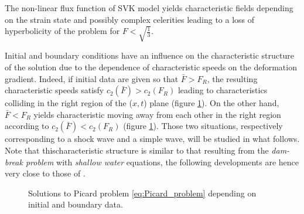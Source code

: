 \begin{remark}
  \label{rq:hyperbolicity_limit_SVK}
  The non-linear flux function of SVK model yields characteristic fields depending on the strain state and possibly complex celerities leading to a loss of hyperbolicity of the problem for $F<\sqrt{\frac{1}{3}}$.
\end{remark}

Initial and boundary conditions have an influence on the characteristic structure of the solution due to the dependence of characteristic speeds on the deformation gradient. Indeed, if initial data are given so that $\bar{F} > F_R$, the resulting characteristic speeds satisfy $c_2(\bar{F})>c_2(F_R)$ leading to characteristics colliding in the right region of the ($x,t$) plane (figure \ref{fig:Picard_problem}). On the other hand, $\bar{F} < F_R$ yields characteristic moving away from each other in the right region according to $c_2(\bar{F})<c_2(F_R)$ (figure \ref{fig:Picard_problem}). Those two situations, respectively corresponding to a shock wave and a simple wave, will be studied in what follows. Note that thischaracteristic structure is similar to that resulting from the \textit{dam-break problem} with \textit{shallow water} equations, the following developments are hence very close to those of \cite[Ch.?]{Leveque}.
\begin{figure}[h!]
  \centering
 \caption{Solutions to Picard problem \eqref{eq:Picard_problem} depending on initial and boundary data.}
  \label{fig:Picard_problem}
\end{figure}

